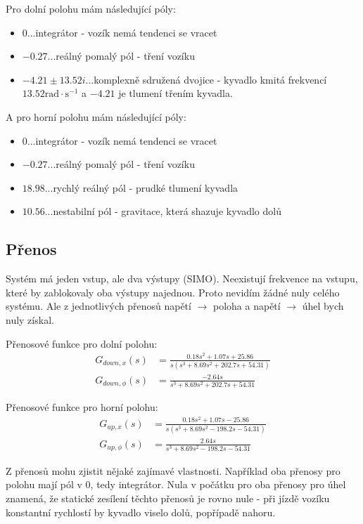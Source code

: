 \documentclass[12pt]{article}
\begin{document}
Pro dolní polohu mám následující póly:

\begin{itemize}
  \item $0$...integrátor - vozík nemá tendenci se vracet
  \item $-0.27$...reálný pomalý pól - tření vozíku
  \item $-4.21 \pm 13.52 i$...komplexně sdružená dvojice - kyvadlo kmitá
  frekvencí $13.52 \mathrm{rad}\cdot\mathrm{s}^{-1}$ a $-4.21$ je tlumení
  třením kyvadla.
\end{itemize}

A pro horní polohu mám následující póly:

\begin{itemize}
  \item $0$...integrátor - vozík nemá tendenci se vracet
  \item $-0.27$...reálný pomalý pól - tření vozíku
  \item $18.98$...rychlý reálný pól - prudké tlumení kyvadla
  \item $10.56$...nestabilní pól - gravitace, která shazuje kyvadlo dolů
\end{itemize}

\subsection{Přenos}
Systém má jeden vstup, ale dva výstupy (SIMO). Neexistují frekvence na vstupu,
které by zablokovaly oba výstupy najednou. Proto nevidím žádné nuly celého
systému.  Ale z jednotlivých přenosů napětí $\rightarrow$ poloha a napětí
$\rightarrow$ úhel bych nuly získal.

Přenosové funkce pro dolní polohu:
\begin{align*}
    G_{down, x}(s) &= \frac{0.18 s^2 + 1.07 s + 25.86}{s(s^3 + 8.69 s^2 + 202.7 s + 54.31)} \\
    G_{down, \phi}(s) &= \frac{-2.64 s}{s^3 + 8.69 s^2 + 202.7 s + 54.31}
\end{align*}

Přenosové funkce pro horní polohu:
\begin{align*}
    G_{up, x}(s) &= \frac{0.18 s^2 + 1.07 s - 25.86}{s(s^3 + 8.69 s^2 - 198.2 s - 54.31)} \\
    G_{up, \phi}(s) &= \frac{2.64 s}{s^3 + 8.69 s^2 - 198.2 s - 54.31}
\end{align*}

Z přenosů mohu zjistit nějaké zajímavé vlastnosti. Například oba přenosy pro
polohu mají pól v $0$, tedy integrátor. Nula v počátku pro oba přenosy pro úhel
znamená, že statické zesílení těchto přenosů je rovno nule - při jízdě vozíku
konstantní rychlostí by kyvadlo viselo dolů, popřípadě nahoru.
\end{document}
